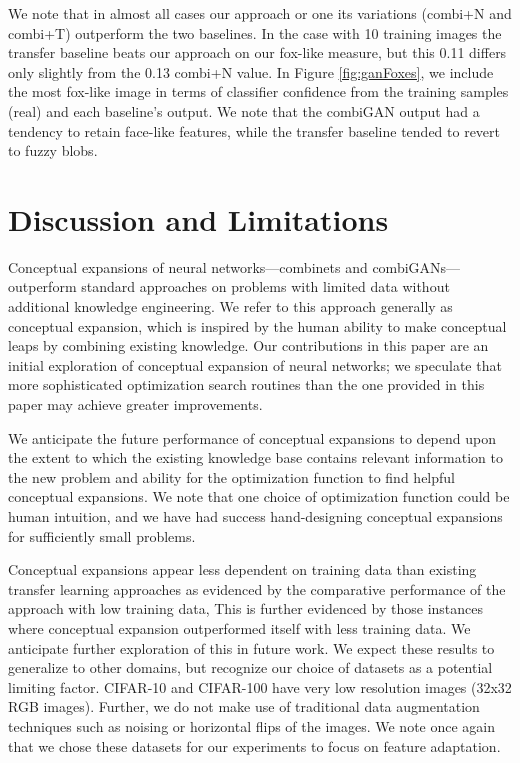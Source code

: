 \documentclass[letterpaper]{article}
\begin{document}
We note that in almost all cases our approach or one its variations (combi+N and combi+T) outperform the two baselines. In the case with 10 training images the transfer baseline beats our approach on our fox-like measure, but this 0.11 differs only slightly from the 0.13 combi+N value. In Figure \ref{fig:ganFoxes}, we include the most fox-like image in terms of classifier confidence from the training samples (real) and each baseline's output. We note that the combiGAN output had a tendency to retain face-like features, while the transfer baseline tended to revert to fuzzy blobs.

\section{Discussion and Limitations}

Conceptual expansions of neural networks---combinets and combiGANs---outperform standard approaches on problems with limited data without additional knowledge engineering.
We refer to this approach generally as conceptual expansion, which is inspired by the human ability to make conceptual leaps by combining existing knowledge. 
Our contributions in this paper are an initial exploration of conceptual expansion of neural networks; we speculate that more sophisticated optimization search routines than the one provided in this paper may achieve greater improvements.

We anticipate the future performance of conceptual expansions to depend upon the extent to which the existing knowledge base contains relevant information to the new problem and ability for the optimization function to find helpful conceptual expansions. We note that one choice of optimization function could be human intuition, and we have had success hand-designing conceptual expansions for sufficiently small problems. 

Conceptual expansions appear less dependent on training data than existing transfer learning approaches as evidenced by the comparative performance of the approach with low training data, This is further evidenced by those instances where conceptual expansion outperformed itself with less training data. We anticipate further exploration of this in future work. We expect these results to generalize to other domains, but recognize our choice of datasets as a potential limiting factor. CIFAR-10 and CIFAR-100 have very low resolution images (32x32 RGB images). Further, we do not make use of traditional data augmentation techniques such as noising or horizontal flips of the images. We note once again that we chose these datasets for our experiments to focus on feature adaptation.
\end{document}
